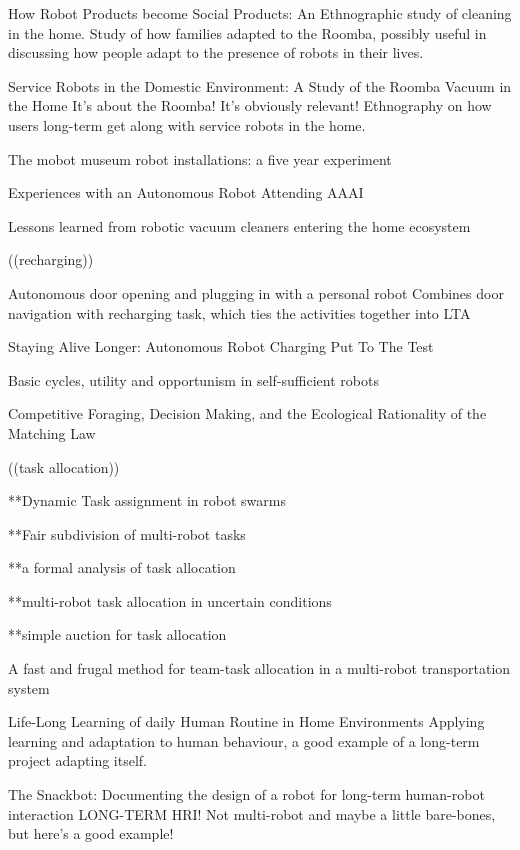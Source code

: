 \documentclass{sfuthesis}
\begin{document}
How Robot Products become Social Products: An Ethnographic study of cleaning in the home.	Study of how families adapted to the Roomba, possibly useful in discussing how people adapt to the presence of robots in their lives.	

Service Robots in the Domestic Environment: A Study of the Roomba Vacuum in the Home	It's about the Roomba! It's obviously relevant! Ethnography on how users long-term get along with service robots in the home.	

The mobot museum robot installations: a five year experiment

Experiences with an Autonomous Robot Attending AAAI

Lessons learned from robotic vacuum cleaners entering the home ecosystem

((recharging))

Autonomous door opening and plugging in with a personal robot	Combines door navigation with recharging task, which ties the activities together into LTA

Staying Alive Longer: Autonomous Robot Charging Put To The Test

Basic cycles, utility and opportunism in self-sufficient robots

Competitive Foraging, Decision Making, and the Ecological Rationality of the Matching Law


((task allocation))

**Dynamic Task assignment in robot swarms

**Fair subdivision of multi-robot tasks

**a formal analysis of task allocation

**multi-robot task allocation in uncertain conditions

**simple auction for task allocation

A fast and frugal method for team-task allocation in a multi-robot transportation system






Life-Long Learning of daily Human Routine in Home Environments	Applying learning and adaptation to human behaviour, a good example of a long-term project adapting itself.

The Snackbot: Documenting the design of a robot for long-term human-robot interaction	LONG-TERM HRI! Not multi-robot and maybe a little bare-bones, but here's a good example!
\end{document}
